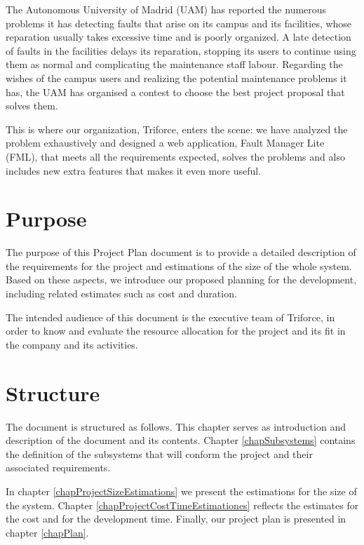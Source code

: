 \documentclass[11pt]{report}
\begin{document}
The Autonomous University of Madrid (UAM) has reported the numerous problems it has detecting faults that arise on its campus and its facilities, whose reparation usually takes excessive time and is poorly organized. A late detection of faults in the facilities delays its reparation, stopping its users to continue using them as normal and complicating the maintenance staff labour. Regarding the wishes of the campus users and realizing the potential maintenance problems it has, the UAM has organised a contest to choose the best project proposal that solves them.

This is where our organization, Triforce, enters the scene: we have analyzed the problem exhaustively and designed a web application, Fault Manager Lite (FML), that meets all the requirements expected, solves the problems and also includes new extra features that makes it even more useful.

\section{Purpose}

The purpose of this Project Plan document is to provide a detailed description of the requirements for the project and estimations of the size of the whole system. Based on these aspects, we introduce our proposed planning for the development, including related estimates such as cost and duration.

The intended audience of this document is the executive team of Triforce, in order to know and evaluate the resource allocation for the project and its fit in the company and its activities.



\section{Structure}

The document is structured as follows. This chapter serves as introduction and description of the document and its contents. Chapter \ref{chapSubsystems} contains the definition of the subsystems that will conform the project and their associated requirements.

In chapter \ref{chapProjectSizeEstimations} we present the estimations for the size of the system. Chapter \ref{chapProjectCostTimeEstimationes} reflects the estimates for the cost and for the development time. Finally, our project plan is presented in chapter \ref{chapPlan}.
\end{document}
